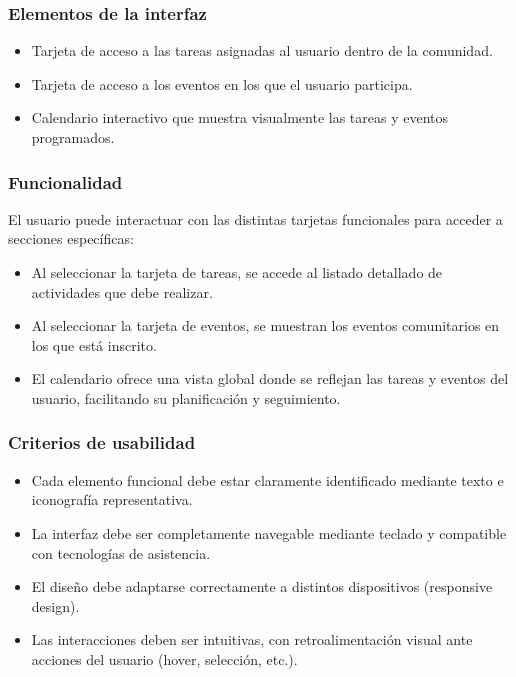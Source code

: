 \subsubsection{Elementos de la interfaz}
\begin{itemize}
  \item Tarjeta de acceso a las tareas asignadas al usuario dentro de la comunidad.
  \item Tarjeta de acceso a los eventos en los que el usuario participa.
  \item Calendario interactivo que muestra visualmente las tareas y eventos programados.
\end{itemize}

\subsubsection{Funcionalidad}
El usuario puede interactuar con las distintas tarjetas funcionales para acceder a secciones específicas:
\begin{itemize}
  \item Al seleccionar la tarjeta de tareas, se accede al listado detallado de actividades que debe realizar.
  \item Al seleccionar la tarjeta de eventos, se muestran los eventos comunitarios en los que está inscrito.
  \item El calendario ofrece una vista global donde se reflejan las tareas y eventos del usuario, facilitando su planificación y seguimiento.
\end{itemize}

\subsubsection{Criterios de usabilidad}
\begin{itemize}
  \item Cada elemento funcional debe estar claramente identificado mediante texto e iconografía representativa.
  \item La interfaz debe ser completamente navegable mediante teclado y compatible con tecnologías de asistencia.
  \item El diseño debe adaptarse correctamente a distintos dispositivos (responsive design).
  \item Las interacciones deben ser intuitivas, con retroalimentación visual ante acciones del usuario (hover, selección, etc.).
\end{itemize}


